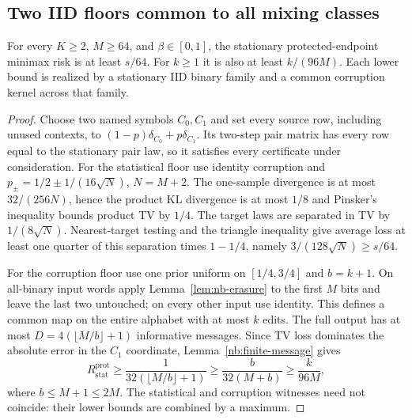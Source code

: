 \subsection{Two IID floors common to all mixing classes}
\begin{lemma}\label{nb:iid-floors}
For every $K\geq2$, $M\geq64$, and $\beta\in[0,1]$, the stationary
protected-endpoint minimax risk is at least $s/64$.  For $k\geq1$ it is
also at least $k/(96M)$.  Each lower bound is realized by a stationary
IID binary family and a common corruption kernel across that family.
\end{lemma}
\begin{proof}
Choose two named symbols $C_0,C_1$ and set every source row, including
unused contexts, to $(1-p)\delta_{C_0}+p\delta_{C_1}$.  Its two-step
pair matrix has every row equal to the stationary pair law, so it
satisfies every certificate under consideration.
For the statistical floor use identity corruption and
$p_\pm=1/2\pm1/(16\sqrt N)$, $N=M+2$.
The one-sample divergence is at most $32/(256N)$, hence the product
KL divergence is at most $1/8$ and Pinsker's inequality bounds product
TV by $1/4$.  The target laws are separated in TV by $1/(8\sqrt N)$.
Nearest-target testing and the triangle inequality give average loss at
least one quarter of this separation times $1-1/4$, namely
$3/(128\sqrt N)\geq s/64$.

For the corruption floor use one prior uniform on $[1/4,3/4]$ and
$b=k+1$.  On all-binary input words apply Lemma~\ref{lem:nb-erasure}
to the first $M$ bits and leave the last two untouched; on every other
input use identity.  This defines a common map on the entire alphabet
with at most $k$ edits.  The full output has at most
$D=4(\lfloor M/b\rfloor+1)$ informative messages.
Since TV loss dominates the absolute error in the $C_1$ coordinate,
Lemma~\ref{nb:finite-message} gives
\[
 R_{\mathrm{stat}}^{\mathrm{prot}}
 \geq\frac1{32(\lfloor M/b\rfloor+1)}
 \geq\frac b{32(M+b)}\geq\frac{k}{96M},
\]
where $b\leq M+1\leq2M$.  The statistical and corruption witnesses
need not coincide: their lower bounds are combined by a maximum.
\end{proof}


